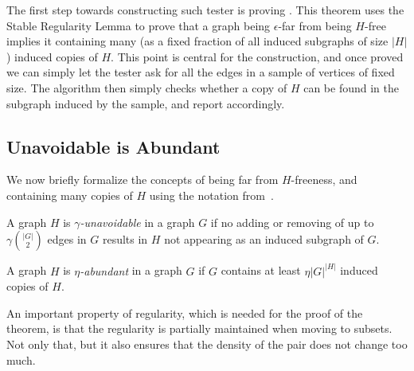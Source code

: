     The first step towards constructing such tester is proving .
    This theorem uses the Stable Regularity Lemma to prove that a graph being $\epsilon$-far
    from being $H$-free implies it containing many (as a fixed fraction of all induced subgraphs of size $|H|$)
    induced copies of $H$.
    This point is central for the construction, and once proved we can simply let the tester ask for all the edges
    in a sample of vertices of fixed size.
    The algorithm then simply checks whether a copy of $H$ can be found in the subgraph induced by the sample, and report
    accordingly.

    \subsection{Unavoidable is Abundant} \label{subsec:subsection_6.1}

        We now briefly formalize the concepts of being far from $H$-freeness, and containing many copies of $H$ using the
        notation from~\cite{efficient_testing_of_large_graphs}.

        \begin{definition} \label{def:unavoidable}
            A graph $H$ is \emph{$\gamma$-unavoidable} in a graph $G$ if no adding or removing of up to $\gamma {|G| \choose 2}$
            edges in $G$ results in $H$ not appearing as an induced subgraph of $G$.
        \end{definition}

        \begin{definition} \label{def:abundant}
            A graph $H$ is \emph{$\eta$-abundant} in a graph $G$ if $G$ contains at least $\eta |G|^{|H|}$
            induced copies of $H$.
        \end{definition}

        An important property of regularity, which is needed for the proof of the theorem, is that the regularity is
        partially maintained when moving to subsets.
        Not only that, but it also ensures that the density of the pair does not change too much.

